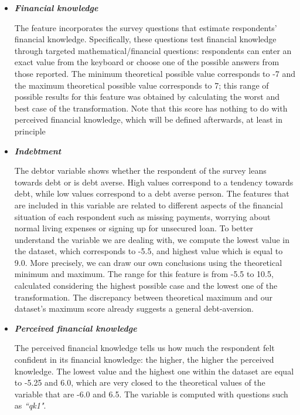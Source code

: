 \documentclass[a4paper,11pt]{article}
\begin{document}
\begin{itemize}

\item{\textit{\textbf{Financial knowledge}}}

The feature incorporates the survey questions that estimate respondents' financial knowledge. Specifically, these questions test financial knowledge through targeted mathematical/financial questions: respondents can enter an exact value from the keyboard or choose one of the possible answers from those reported.
The minimum theoretical possible value corresponds to -7 and the maximum theoretical possible value corresponds to 7; this range of possible results for this feature was obtained by calculating the worst and best case of the transformation. 
Note that this score has nothing to do with perceived financial knowledge, which will be defined afterwards, at least in principle

\item{\textit{\textbf{Indebtment}}}

The debtor variable shows whether the respondent of the survey leans towards debt or is debt averse. High values correspond to a tendency towards debt, while low values correspond to a debt averse person. 
The features that are included in this variable are related to different aspects of the financial situation of each respondent such as missing payments, worrying about normal living expenses or signing up for unsecured loan. 
To better understand the variable we are dealing with, we compute the lowest value in the dataset, which corresponds to -5.5, and highest value which is equal to 9.0. More precisely, we can draw our own conclusions using the theoretical minimum and maximum. The range for this feature is from -5.5 to 10.5, calculated considering the highest possible case and the lowest one of the transformation. The discrepancy between theoretical maximum and our dataset's maximum score already suggests a general debt-aversion.

\item{\textit{\textbf{Perceived financial knowledge}}}

The perceived financial knowledge tells us how much the respondent felt confident in its financial knowledge: the higher, the higher the perceived knowledge. The lowest value and the highest one within the dataset are equal to -5.25 and 6.0, which are very closed to the theoretical values of the variable that are -6.0 and 6.5. The variable is computed with questions such as \textit{``qk1"}.


\end{itemize}
\end{document}
